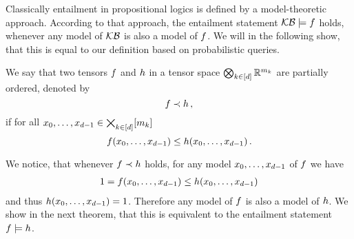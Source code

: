 
Classically entailment in propositional logics is defined by a model-theoretic approach.
According to that approach, the entailment statement $\mathcal{KB}\models f$ holds, whenever any model of $\mathcal{KB}$ is also a model of $f$.
We will in the following show, that this is equal to our definition based on probabilistic queries.


\begin{definition}\label{def:partialFTOrder}
	We say that two tensors $f$ and $h$ in a tensor space $\bigotimes_{k\in[d]} \mathbb{R}^{m_{k}}$ are partially ordered, denoted by
		\[ {f}\prec{h} \, , \]
	if for all $x_{0},\ldots,x_{d-1}\in\bigtimes_{k\in[d]}[m_{k}]$
		\[ {f}(x_{0},\ldots,x_{d-1}) \leq {h}(x_{0},\ldots,x_{d-1}) \, .\]
\end{definition}

We notice, that whenever ${f} \prec{h}$ holds, for any model ${x_{0},\ldots,x_{d-1}}$ of $f$ we have
\begin{align*}
	1 = f({x_{0},\ldots,x_{d-1}}) \leq h({x_{0},\ldots,x_{d-1}})
\end{align*}
and thus $h({x_{0},\ldots,x_{d-1}})=1$.
Therefore any model of $f$ is also a model of $h$.
We show in the next theorem, that this is equivalent to the entailment statement $f\models h$.

